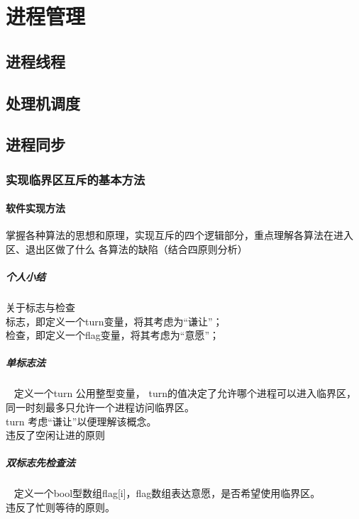 \chapter{进程管理}

\section{进程线程}
\section{处理机调度}
\section{进程同步}

\subsection{实现临界区互斥的基本方法}
\subsubsection{软件实现方法}
掌握各种算法的思想和原理，实现互斥的四个逻辑部分，重点理解各算法在进入区、退出区做了什么
各算法的缺陷（结合四原则分析）

\paragraph{个人小结}
关于标志与检查 \\
标志，即定义一个turn变量，将其考虑为“谦让”； \\
检查，即定义一个flag变量，将其考虑为“意愿”； \\

\paragraph{单标志法}~{}		%
\newline
定义一个turn 公用整型变量，
turn的值决定了允许哪个进程可以进入临界区，
同一时刻最多只允许一个进程访问临界区。 \\
turn 考虑“谦让”以便理解该概念。 \\
违反了空闲让进的原则 \\ 

\paragraph{双标志先检查法}~{}
\newline
定义一个bool型数组flag[i]，flag数组表达意愿，是否希望使用临界区。 \\
违反了忙则等待的原则。 \\

